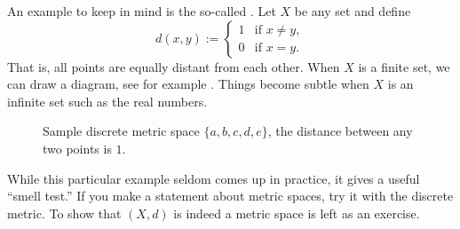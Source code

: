\documentclass[12pt]{book}
\begin{document}
\begin{example}
An example to keep in mind is the so-called \emph{}.
Let $X$ be any set and define
\begin{equation*}
d(x,y) :=
\begin{cases}
1 & \text{if $x \not= y$}, \\
0 & \text{if $x = y$}.
\end{cases}
\end{equation*}
That is, all points are equally distant from each other.
When $X$ is a
finite set, we can draw a diagram, see for example
.
Things become subtle when $X$ is an infinite set such
as the real numbers.
\begin{figure}[h!t]
\begin{center}

\caption{Sample discrete metric space $\{ a,b,c,d,e \}$, the distance
between any two points is $1$.\label{fig:msdiscmetric}}
\end{center}
\end{figure}

While this particular
example seldom comes up in practice, it gives a useful 
``smell test.''  If you make a statement about metric spaces,
try it with the discrete metric.
To show that $(X,d)$ is indeed a metric space is left as an exercise.
\end{example}
\end{document}
